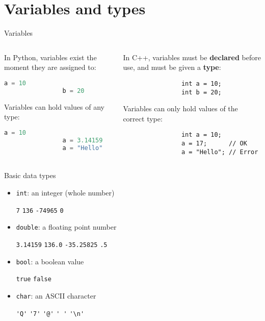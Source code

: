 \part{Variables and types}
\frame{\partpage}

\begin{frame}[fragile]{Variables}
	\begin{columns}[onlytextwidth]
		\begin{column}{0.45\textwidth}
			In Python, variables exist the moment they are assigned to:
			\begin{lstlisting}[language=Python]
				a = 10
				b = 20
			\end{lstlisting}
			\pause
			Variables can hold values of any type:
			\begin{lstlisting}[language=Python]
				a = 10
				a = 3.14159
				a = "Hello"
			\end{lstlisting}
		\end{column}
		\pause
		\begin{column}{0.45\textwidth}
			In C++, variables must be \textbf{declared} before use, and must be given a \textbf{type}:
			\begin{lstlisting}
				int a = 10;
				int b = 20;
			\end{lstlisting}
			\pause
			Variables can only hold values of the correct type:
			\begin{lstlisting}
				int a = 10;
				a = 17;      // OK
				a = "Hello"; // Error
			\end{lstlisting}
		\end{column}
	\end{columns}
\end{frame}

\begin{frame}[fragile]{Basic data types}
	\begin{itemize}
		\item \lstinline{int}: an integer (whole number)
			\begin{center} \lstinline{7} \qquad \lstinline{136} \qquad \lstinline{-74965} \qquad \lstinline{0} \end{center}
		\pause
		\item \lstinline{double}: a floating point number
			\begin{center} \lstinline{3.14159} \qquad \lstinline{136.0} \qquad \lstinline{-35.25825} \qquad \lstinline{.5} \end{center}
		\pause
		\item \lstinline{bool}: a boolean value
			\begin{center} \lstinline{true} \qquad \lstinline{false} \end{center}
		\pause
		\item \lstinline{char}: an ASCII character
			\begin{center} \lstinline{'Q'} \qquad \lstinline{'7'} \qquad \lstinline{'@'} \qquad \lstinline{' '} \qquad \lstinline{'\n'} \end{center}
	\end{itemize}
\end{frame}

